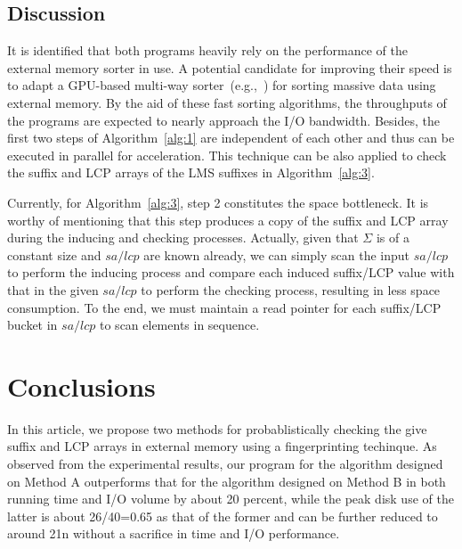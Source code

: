 \documentclass[10pt,journal,compsoc]{IEEEtran}
\begin{document}
	\subsection{Discussion}
	
	It is identified that both programs heavily rely on the performance of the external memory sorter in use. A potential candidate for improving their speed is to adapt a GPU-based multi-way sorter~(e.g.,~\cite{Leischner2010, Davidson2012}) for sorting massive data using external memory. By the aid of these fast sorting algorithms, the throughputs of the programs are expected to nearly approach the I/O bandwidth. Besides, the first two steps of Algorithm~\ref{alg:1} are independent of each other and thus can be executed in parallel for acceleration. This technique can be also applied to check the suffix and LCP arrays of the LMS suffixes in Algorithm~\ref{alg:3}.
	
	Currently, for Algorithm~\ref{alg:3}, step 2 constitutes the space bottleneck. It is worthy of mentioning that this step produces a copy of the suffix and LCP array during the inducing and checking processes. Actually, given that $\Sigma$ is of a constant size and $sa/lcp$ are known already, we can simply scan the input $sa/lcp$ to perform the inducing process and compare each induced suffix/LCP value with that in the given $sa/lcp$ to perform the checking process, resulting in less space consumption. To the end, we must maintain a read pointer for each suffix/LCP bucket in $sa/lcp$ to scan elements in sequence.
	
\section{Conclusions} \label{sec:conclusion}

In this article, we propose two methods for probablistically checking the give suffix and LCP arrays in external memory using a fingerprinting techinque. As observed from the experimental results, our program for the algorithm designed on Method A outperforms that for the algorithm designed on Method B in both running time and I/O volume by about 20 percent, while the peak disk use of the latter is about 26/40=0.65 as that of the former and can be further reduced to around 21n without a sacrifice in time and I/O performance.






	
\end{document}
